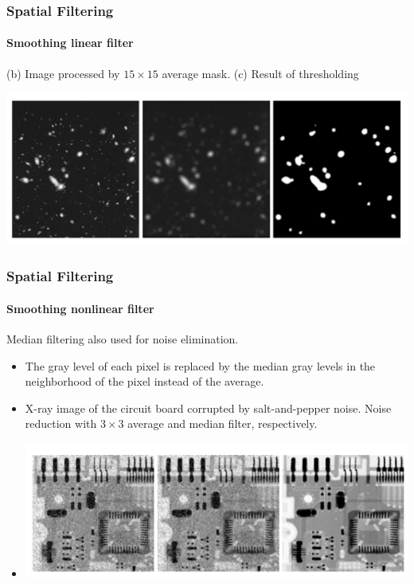 \documentclass{beamer}
\begin{document}
\begin{frame}
\frametitle{Spatial Filtering}
\framesubtitle{Smoothing linear filter}
(b) Image processed by $15 \times 15$ average mask. (c) Result of thresholding 
\begin{center}
\includegraphics[scale=0.3]{images/Spatial5-averagefilter.png}
\end{center}
\end{frame}
\begin{frame}
\frametitle{Spatial Filtering}
\framesubtitle{Smoothing nonlinear filter}
Median filtering also used for noise elimination. 
\begin{itemize}
\item The gray level of each pixel is replaced by the median gray levels in the neighborhood of the pixel instead of the average.
\item X-ray image of the circuit board corrupted by salt-and-pepper noise. Noise reduction with $3 \times 3$ average and median filter, respectively.
\item[]\begin{center}
\includegraphics[scale=0.3]{images/Spatial6-averagemedian.png}
\end{center}  
\end{itemize}
\end{frame}
\end{document}
